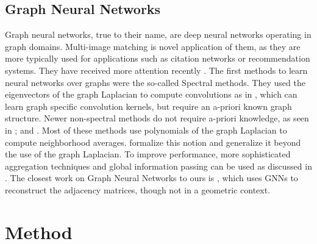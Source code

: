 \documentclass{article} %
\begin{document}
\subsection{Graph Neural Networks}
Graph neural networks, true to their name, are deep neural networks operating in graph domains.
Multi-image matching is novel application of them, as they are more typically used for applications such as citation networks or recommendation systems.
They have received more attention recently \citep{bronstein2017geometric, defferrard2016convolutional, kipf2017semi, scarselli2009graph, gama2018mimo, gama2018convolutional, battaglia2018relational}.
The first methods to learn neural networks over graphs were the so-called Spectral methods.
They used the eigenvectors of the graph Laplacian to compute convolutions as in \cite{bruna2013spectral}, which can learn graph specific convolution kernels, but require an a-priori known graph structure. 
Newer non-spectral methods do not require a-priori knowledge, as seen in \cite{bronstein2017geometric, kipf2017semi, scarselli2009graph}; and \cite{gama2018convolutional}.
Most of these methods use polynomials of the graph Laplacian to compute neighborhood averages.
\cite{gama2018mimo, gama2018convolutional} formalize this notion and generalize it beyond the use of the graph Laplacian.
To improve performance, more sophisticated aggregation techniques and global information passing can be used as discussed in \cite{battaglia2018relational}.
The closest work on Graph Neural Networks to ours is \cite{kipf2016variational}, which uses GNNs to reconstruct the adjacency matrices, though not in a geometric context.

\section{Method}
\end{document}
